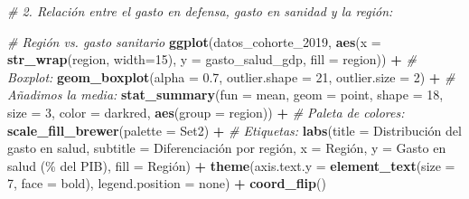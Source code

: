 \documentclass[notspecified,article,submit,moreauthors,pdftex]{Definitions/mdpi}
\newenvironment{Shaded}{\begin{snugshade}}{\end{snugshade}}
\newcommand{\AttributeTok}[1]{\textcolor[rgb]{0.13,0.29,0.53}{#1}}
\newcommand{\CommentTok}[1]{\textcolor[rgb]{0.56,0.35,0.01}{\textit{#1}}}
\newcommand{\DecValTok}[1]{\textcolor[rgb]{0.00,0.00,0.81}{#1}}
\newcommand{\FloatTok}[1]{\textcolor[rgb]{0.00,0.00,0.81}{#1}}
\newcommand{\FunctionTok}[1]{\textcolor[rgb]{0.13,0.29,0.53}{\textbf{#1}}}
\newcommand{\NormalTok}[1]{#1}
\newcommand{\SpecialCharTok}[1]{\textcolor[rgb]{0.81,0.36,0.00}{\textbf{#1}}}
\newcommand{\StringTok}[1]{\textcolor[rgb]{0.31,0.60,0.02}{#1}}
\begin{document}
\begin{Shaded}
\begin{Highlighting}[]
\CommentTok{\# 2. Relación entre el gasto en defensa, gasto en sanidad y la región:}

\CommentTok{\# Región vs. gasto sanitario}
\FunctionTok{ggplot}\NormalTok{(datos\_cohorte\_2019, }\FunctionTok{aes}\NormalTok{(}\AttributeTok{x =} \FunctionTok{str\_wrap}\NormalTok{(region, }\AttributeTok{width=}\DecValTok{15}\NormalTok{), }\AttributeTok{y =}\NormalTok{ gasto\_salud\_gdp, }
                               \AttributeTok{fill =}\NormalTok{ region)) }\SpecialCharTok{+}
  \CommentTok{\# Boxplot:}
  \FunctionTok{geom\_boxplot}\NormalTok{(}\AttributeTok{alpha =} \FloatTok{0.7}\NormalTok{, }\AttributeTok{outlier.shape =} \DecValTok{21}\NormalTok{, }\AttributeTok{outlier.size =} \DecValTok{2}\NormalTok{) }\SpecialCharTok{+}
  \CommentTok{\# Añadimos la media:}
  \FunctionTok{stat\_summary}\NormalTok{(}\AttributeTok{fun =}\NormalTok{ mean, }\AttributeTok{geom =} \StringTok{\textquotesingle{}point\textquotesingle{}}\NormalTok{, }\AttributeTok{shape =} \DecValTok{18}\NormalTok{, }
               \AttributeTok{size =} \DecValTok{3}\NormalTok{, }\AttributeTok{color =} \StringTok{\textquotesingle{}darkred\textquotesingle{}}\NormalTok{, }\FunctionTok{aes}\NormalTok{(}\AttributeTok{group =}\NormalTok{ region)) }\SpecialCharTok{+}
  \CommentTok{\# Paleta de colores:}
  \FunctionTok{scale\_fill\_brewer}\NormalTok{(}\AttributeTok{palette =} \StringTok{\textquotesingle{}Set2\textquotesingle{}}\NormalTok{) }\SpecialCharTok{+} 
  \CommentTok{\# Etiquetas:}
  \FunctionTok{labs}\NormalTok{(}\AttributeTok{title =} \StringTok{\textquotesingle{}Distribución del gasto en salud\textquotesingle{}}\NormalTok{,}
    \AttributeTok{subtitle =} \StringTok{\textquotesingle{}Diferenciación por región\textquotesingle{}}\NormalTok{,}
    \AttributeTok{x =} \StringTok{\textquotesingle{}Región\textquotesingle{}}\NormalTok{,}
    \AttributeTok{y =} \StringTok{\textquotesingle{}Gasto en salud (\% del PIB)\textquotesingle{}}\NormalTok{,}
    \AttributeTok{fill =} \StringTok{\textquotesingle{}Región\textquotesingle{}}\NormalTok{) }\SpecialCharTok{+}
  \FunctionTok{theme}\NormalTok{(}\AttributeTok{axis.text.y =} \FunctionTok{element\_text}\NormalTok{(}\AttributeTok{size =} \DecValTok{7}\NormalTok{, }\AttributeTok{face =} \StringTok{\textquotesingle{}bold\textquotesingle{}}\NormalTok{),}
        \AttributeTok{legend.position =} \StringTok{\textquotesingle{}none\textquotesingle{}}\NormalTok{) }\SpecialCharTok{+} \FunctionTok{coord\_flip}\NormalTok{()}
\end{Highlighting}
\end{Shaded}
\end{document}
